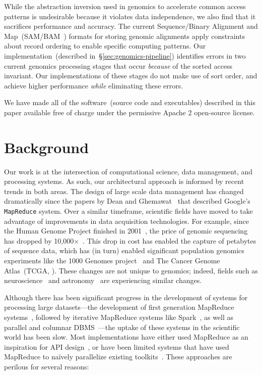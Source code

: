 \documentclass{acm_proc_article-sp}
\begin{document}
While the abstraction inversion used in genomics to accelerate common access patterns is undesirable
because it violates data independence, we also find that it sacrifices performance and
accuracy. The current Sequence/Binary Alignment and Map~(SAM/BAM~\cite{li09}) formats for storing
genomic alignments apply constraints about record ordering to enable specific computing patterns. Our
implementation~(described in~\S\ref{sec:genomics-pipeline}) identifies errors in two current genomics
processing stages that occur \emph{because} of the sorted access invariant. Our implementations of
these stages do not make use of sort order, and achieve higher performance \emph{while} eliminating
these errors.

We have made all of the software~(source code and executables) described in this paper available free
of charge under the permissive Apache 2 open-source license.

\section{Background}
\label{sec:background}

Our work is at the intersection of computational science, data management, and processing
systems. As such, our architectural approach is informed by recent trends in both areas. The design of
large scale data management has changed dramatically since the papers by Dean and
Ghemawat~\cite{dean04, dean08} that described Google's \texttt{MapReduce} system. Over a
similar timeframe, scientific fields have moved to take advantage of improvements in data acquisition
technologies. For example, since the Human Genome Project finished in 2001~\cite{lander01}, the price
of genomic sequencing has dropped by 10,000$\times$~\cite{nhgri}. This drop in cost has enabled the
capture of petabytes of sequence data, which has (in turn) enabled significant population genomics
experiments like the 1000 Genomes project~\cite{siva08} and The Cancer Genome Atlas~(TCGA,
\cite{weinstein13}). These changes are not unique to genomics; indeed, fields such as
neuroscience~\cite{cunningham14} and astronomy~\cite{lsst2008, turk11, sdss2000} are experiencing similar
changes.

Although there has been significant progress in the development of systems for processing large
datasets---the development of first generation MapReduce systems~\cite{dean04}, followed by
iterative MapReduce systems like Spark~\cite{zaharia10}, as well as parallel and columnar
DBMS~\cite{abadi06, lamb12}---the uptake of these systems in the scientific world has been slow.
Most implementations have either used MapReduce as an inspiration for API
design~\cite{mckenna10}, or have been limited systems that have used MapReduce to na\"{i}vely
parallelize existing toolkits~\cite{langmead09, schatz09}. These approaches are perilous for several
reasons:
\end{document}
